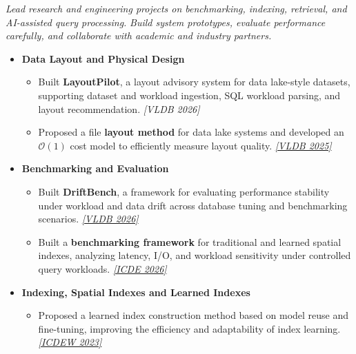 \documentclass{resume}
\begin{document}
\textit{Lead research and engineering projects on benchmarking, indexing, retrieval, and AI-assisted query processing.}
\textit{Build system prototypes, evaluate performance carefully, and collaborate with academic and industry partners.}

\begin{itemize}[parsep=0.4ex]


\item \textbf{Data Layout and Physical Design}
\begin{itemize}[parsep=0.3ex]
\item Built \textbf{LayoutPilot}, a layout advisory system for data lake-style datasets, supporting dataset and workload ingestion, SQL workload parsing, and layout recommendation.
    \href{https://github.com/Liuguanli/layout_advisor}{\faGithub}
    \textit{[VLDB 2026]}

    \item Proposed a file \textbf{layout method} for data lake systems and developed an \(\mathcal{O}(1)\) cost model to efficiently measure layout quality.
    \href{https://github.com/Liuguanli/LBMC}{\faGithub}
    \href{https://www.vldb.org/pvldb/vol17/p4773-liu.pdf}{\textit{[VLDB 2025\faExternalLink]}}
\end{itemize}

\item \textbf{Benchmarking and Evaluation}
\begin{itemize}[parsep=0.3ex]
    \item Built \textbf{DriftBench}, a framework for evaluating performance stability under workload and data drift across database tuning and benchmarking scenarios.
    \href{https://github.com/Liuguanli/DriftBench}{\faGithub}
    \href{https://arxiv.org/abs/2510.10858}{\textit{[VLDB 2026\faExternalLink]}}
    \item Built a \textbf{benchmarking framework} for traditional and learned spatial indexes, analyzing latency, I/O, and workload sensitivity under controlled query workloads. \href{https://github.com/Liuguanli/rl_spatial_benchmark}{\faGithub}
\href{https://arxiv.org/abs/2512.11161}{\textit{[ICDE 2026\faExternalLink]}}
\end{itemize}

\item \textbf{Indexing, Spatial Indexes and Learned Indexes}
\begin{itemize}[parsep=0.3ex]
    \item Proposed a learned index construction method based on model reuse and fine-tuning, improving the efficiency and adaptability of index learning.
\href{https://people.eng.unimelb.edu.au/jianzhongq/papers/DBML2023_ModelReuse.pdf}{\textit{[ICDEW 2023\faExternalLink]}}


\end{itemize}
\end{itemize}
\end{document}
